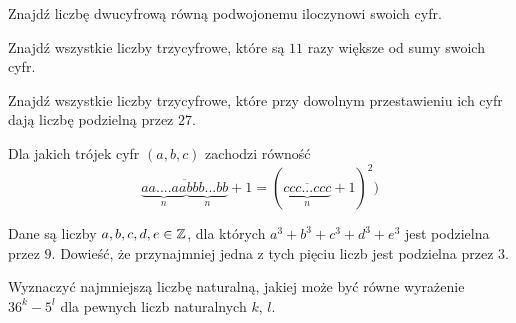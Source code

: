 \documentclass{article}
\begin{document}
\begin{zadanie}
  Znajdź liczbę dwucyfrową równą podwojonemu iloczynowi swoich cyfr.
\end{zadanie}

\begin{zadanie}
  Znajdź wszystkie liczby trzycyfrowe, które są $11$ razy większe od sumy swoich cyfr.
\end{zadanie}

\begin{zadanie}
  Znajdź wszystkie liczby trzycyfrowe, które przy dowolnym przestawieniu ich cyfr dają liczbę podzielną przez $27$.
\end{zadanie}

\begin{zadanie}
  Dla jakich trójek cyfr $(a,b,c)$ zachodzi równość
  $$\overline{\underbrace{aa....aa}_{n}\underbrace{bbb...bb}_{n}}+1=(\overline{\underbrace{ccc...ccc}_n}+1)^2)$$
\end{zadanie}

\begin{zadanie}
  Dane są liczby $a,b,c,d,e\in\mathbb{Z}$, dla których $a^3+b^3+c^3+d^3+e^3$ jest podzielna przez $9$. Dowieść, że przynajmniej jedna z tych pięciu liczb jest podzielna przez $3$.
\end{zadanie}

\begin{zadanie}
  Wyznaczyć najmniejszą liczbę naturalną, jakiej może być równe wyrażenie $36^k-5^l$ dla pewnych liczb naturalnych $k$, $l$.
\end{zadanie}
\end{document}
